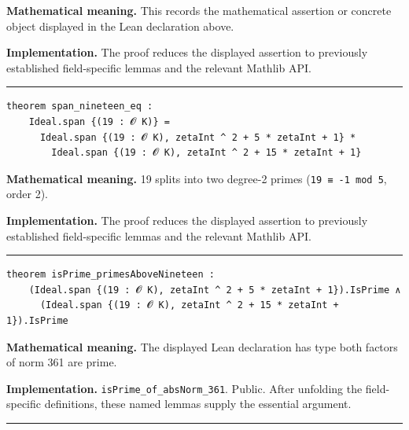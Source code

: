 \documentclass[UTF8,a4paper,11pt,fontset=fandol]{ctexart}
\theoremstyle{definition}
\newcommand{\statementsep}{\par\medskip\hrule\medskip}
\begin{document}
\noindent\textbf{Mathematical meaning.} This records the mathematical assertion or concrete object displayed in the Lean declaration above.\par
\noindent\textbf{Implementation.} The proof reduces the displayed assertion to previously established field-specific lemmas and the relevant Mathlib API.\par
\statementsep
\begin{verbatim}
theorem span_nineteen_eq :
    Ideal.span {(19 : 𝓞 K)} =
      Ideal.span {(19 : 𝓞 K), zetaInt ^ 2 + 5 * zetaInt + 1} *
        Ideal.span {(19 : 𝓞 K), zetaInt ^ 2 + 15 * zetaInt + 1}
\end{verbatim}
\noindent\textbf{Mathematical meaning.} 19 splits into two degree-2 primes (\texttt{19 ≡ -1 mod 5}, order 2).\par
\noindent\textbf{Implementation.} The proof reduces the displayed assertion to previously established field-specific lemmas and the relevant Mathlib API.\par
\statementsep
\begin{verbatim}
theorem isPrime_primesAboveNineteen :
    (Ideal.span {(19 : 𝓞 K), zetaInt ^ 2 + 5 * zetaInt + 1}).IsPrime ∧
      (Ideal.span {(19 : 𝓞 K), zetaInt ^ 2 + 15 * zetaInt + 1}).IsPrime
\end{verbatim}
\noindent\textbf{Mathematical meaning.} The displayed Lean declaration has type both factors of norm 361 are prime.\par
\noindent\textbf{Implementation.} \texttt{isPrime\_\allowbreak{}of\_\allowbreak{}absNorm\_\allowbreak{}361}. Public. After unfolding the field-specific definitions, these named lemmas supply the essential argument.\par
\statementsep
\end{document}
